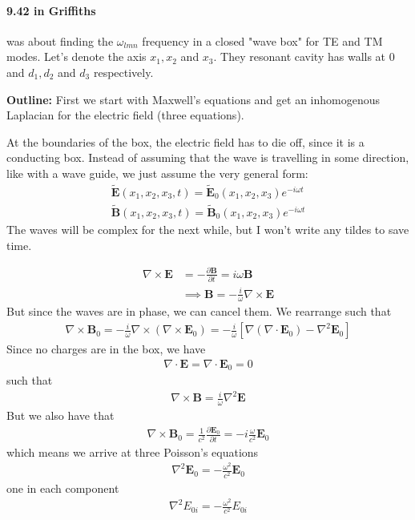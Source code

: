 \paragraph{9.42 in Griffiths} was about finding the \(\omega_{lmn}\) frequency in a closed "wave box" for TE and TM modes. Let's denote the axis \(x_1, x_2\) and \(x_3\). They resonant cavity has walls at \(0\) and \(d_1, d_2\) and \(d_3\) respectively.

\textbf{Outline:} First we start with Maxwell's equations and get an inhomogenous Laplacian for the electric field (three equations). 

At the boundaries of the box, the electric field has to die off, since it is a conducting box. Instead of assuming that the wave is travelling in some direction, like with a wave guide, we just assume the very general form: \begin{align*}
    \tilde{\mathbf{E}}(x_1, x_2, x_3, t) = \tilde{\mathbf{E}}_{0}(x_1, x_2, x_3) e^{-i \omega t} \\
    \tilde{\mathbf{B}}(x_1, x_2, x_3, t) = \tilde{\mathbf{B}}_{0}(x_1, x_2, x_3) e^{-i \omega t} 
\end{align*}
The waves will be complex for the next while, but I won't write any tildes to save time.

\begin{align*}
    \nabla \times \mathbf{E} &= -\frac{\partial \mathbf{B}}{\partial t} = i \omega \mathbf{B}\\
    &\implies \mathbf{B} = -\frac{i}{\omega } \nabla \times \mathbf{E}
\end{align*}
But since the waves are in phase, we can cancel them. We rearrange such that \begin{align*}
    \nabla \times \mathbf{B}_0 = -\frac{i}{\omega } \nabla \times \left( \nabla \times \mathbf{E}_0 \right) = -\frac{i}{\omega } \left[\nabla (\nabla \cdot \mathbf{E}_0) - \nabla ^{2} \mathbf{E}_0\right]
\end{align*}
Since no charges are in the box, we have \begin{align*}
    \nabla \cdot \mathbf{E} = \nabla \cdot \mathbf{E}_0 =  0
\end{align*} 
such that \begin{align*}
    \nabla \times \mathbf{B} = \frac{i}{\omega } \nabla ^{2} \mathbf{E}
\end{align*}
But we also have that \begin{align*}
    \nabla \times \mathbf{B}_0 = \frac{1}{c^{2} }\frac{\partial \mathbf{E}_0}{\partial t} =  -i \frac{\omega}{c^{2} } \mathbf{E}_0
\end{align*}
which means we arrive at three Poisson's equations \begin{align*}
    \boxed{\nabla ^{2} \mathbf{E}_0 = -\frac{\omega^{2}}{c^{2} } \mathbf{E}_0}
\end{align*}
one in each component \begin{align*}
    \nabla ^{2} E_{0i} = -\frac{\omega^{2}}{c^{2} } E_{0i}  
\end{align*}

